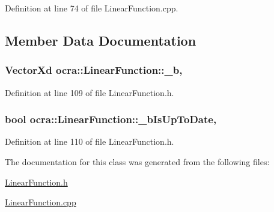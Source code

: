 Definition at line 74 of file Linear\+Function.\+cpp.



\subsection{Member Data Documentation}
\subsubsection[{\texorpdfstring{\+\_\+b}{_b}}]{\setlength{\rightskip}{0pt plus 5cm}Vector\+Xd ocra\+::\+Linear\+Function\+::\+\_\+b\hspace{0.3cm}{\ttfamily [mutable]}, {\ttfamily [protected]}}\hypertarget{classocra_1_1LinearFunction_ab556d7683de415e8273bdbf955f7da02}{}\label{classocra_1_1LinearFunction_ab556d7683de415e8273bdbf955f7da02}


Definition at line 109 of file Linear\+Function.\+h.

\subsubsection[{\texorpdfstring{\+\_\+b\+Is\+Up\+To\+Date}{_bIsUpToDate}}]{\setlength{\rightskip}{0pt plus 5cm}bool ocra\+::\+Linear\+Function\+::\+\_\+b\+Is\+Up\+To\+Date\hspace{0.3cm}{\ttfamily [mutable]}, {\ttfamily [protected]}}\hypertarget{classocra_1_1LinearFunction_a97de5274c98711b37b04aed99c237ce6}{}\label{classocra_1_1LinearFunction_a97de5274c98711b37b04aed99c237ce6}


Definition at line 110 of file Linear\+Function.\+h.



The documentation for this class was generated from the following files\+:\begin{DoxyCompactItemize}
\item 
\hyperlink{LinearFunction_8h}{Linear\+Function.\+h}\item 
\hyperlink{LinearFunction_8cpp}{Linear\+Function.\+cpp}\end{DoxyCompactItemize}

